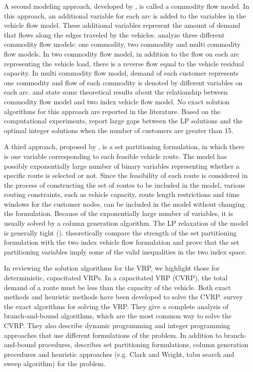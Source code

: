 A second modeling approach, developed by \citet{Garvin}, is called a commodity flow 
model. In this approach, an additional variable for each arc is added to the variables 
in the vehicle flow model. These additional variables represent the amount of demand 
that flows along the edges traveled by the vehicles. \citet{LetchfordG06} 
analyze three different commodity flow models: one commodity, two commodity and multi 
commodity flow models. In two commodity flow model, in addition to the flow on each arc
representing the vehicle load, there is a reverse flow equal to the vehicle residual 
capacity. In multi commodity flow model, demand of each customer represents one commodity
and flow of each commodity is denoted by different variables on each arc. 
\citet{Gouveia95} and \citet{LetchfordG06} state some theoretical results about
the relationship between commodity flow model and two index vehicle flow model.
No exact solution algorithms for 
this approach are reported in the literature. Based on the computational experiments, 
\citet{Gavish} report large gaps between the  LP solutions and the optimal integer 
solutions when the number of customers are greater than 15. 

A third approach, 
proposed by \citet{Balinski}, is a set partitioning formulation, in which there is 
one  variable corresponding to each feasible vehicle route. The model has possibly 
exponentially large number of binary variables representing whether a specific route is 
selected or not. Since the feasibility of each route is considered in the process 
of constructing the set of routes to be included in the model, various routing constraints, 
such as vehicle capacity, route length restrictions and time windows for the customer 
nodes, can be included in the model without changing the formulation. Because of the 
exponentially large number of variables, it is usually solved by a column generation 
algorithm. The LP relaxation 
of the model is generally tight (\citet{Toth}). \citet{LetchfordG06} theoretically
compare the strength of the set partitioning formulation with the two index vehicle 
flow formulation and prove that the set partitioning variables imply some of the
valid inequalities in the two index space.
    
In reviewing the solution algorithms for the VRP, we highlight those for deterministic, 
capacitated VRPs. In a capacitated VRP (CVRP), the total demand of a route must be less than 
the capacity of the vehicle. Both exact methods and heuristic methods have been developed 
to solve the CVRP. \citet{Laporte2} survey the exact algorithms for solving the VRP. 
They give a complete analysis of branch-and-bound algorithms, which are the most common 
way to solve the CVRP. They also describe dynamic programming and integer programming 
approaches that use different formulations of the problem. 
In addition to branch-and-bound procedures, 
\citet{Laporte3} describes set partitioning formulations, column 
generation procedures and heuristic approaches (e.g. Clark and Wright, tabu search 
and sweep algorithm) for the problem. 


